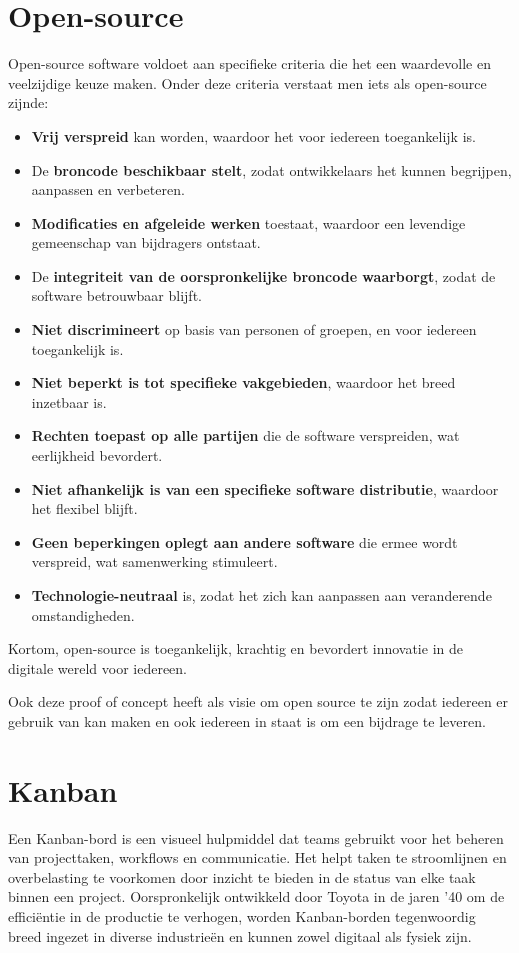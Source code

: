 \section{Open-source}
Open-source software voldoet aan specifieke criteria die het een waardevolle en veelzijdige keuze maken. Onder deze criteria verstaat men iets als open-source zijnde:
\begin{itemize}
    \item \textbf{Vrij verspreid} kan worden, waardoor het voor iedereen toegankelijk is.
    \item De \textbf{broncode beschikbaar stelt}, zodat ontwikkelaars het kunnen begrijpen, aanpassen en verbeteren.
    \item \textbf{Modificaties en afgeleide werken} toestaat, waardoor een levendige gemeenschap van bijdragers ontstaat.
    \item De \textbf{integriteit van de oorspronkelijke broncode waarborgt}, zodat de software betrouwbaar blijft.
    \item \textbf{Niet discrimineert} op basis van personen of groepen, en voor iedereen toegankelijk is.
    \item \textbf{Niet beperkt is tot specifieke vakgebieden}, waardoor het breed inzetbaar is.
    \item \textbf{Rechten toepast op alle partijen} die de software verspreiden, wat eerlijkheid bevordert.
    \item \textbf{Niet afhankelijk is van een specifieke software distributie}, waardoor het flexibel blijft.
    \item \textbf{Geen beperkingen oplegt aan andere software} die ermee wordt verspreid, wat samenwerking stimuleert.
    \item \textbf{Technologie-neutraal} is, zodat het zich kan aanpassen aan veranderende omstandigheden.
\end{itemize}

Kortom, open-source is toegankelijk, krachtig en bevordert innovatie in de digitale wereld voor iedereen.\autocite{OpenSource2006}

Ook deze proof of concept heeft als visie om open source te zijn zodat iedereen er gebruik van kan maken en ook iedereen in staat is om een bijdrage te leveren.

\section{Kanban}
Een Kanban-bord is een visueel hulpmiddel dat teams gebruikt voor het beheren van projecttaken, workflows en communicatie. Het helpt taken te stroomlijnen en overbelasting te voorkomen door inzicht te bieden in de status van elke taak binnen een project. Oorspronkelijk ontwikkeld door Toyota in de jaren '40 om de efficiëntie in de productie te verhogen, worden Kanban-borden tegenwoordig breed ingezet in diverse industrieën en kunnen zowel digitaal als fysiek zijn.

